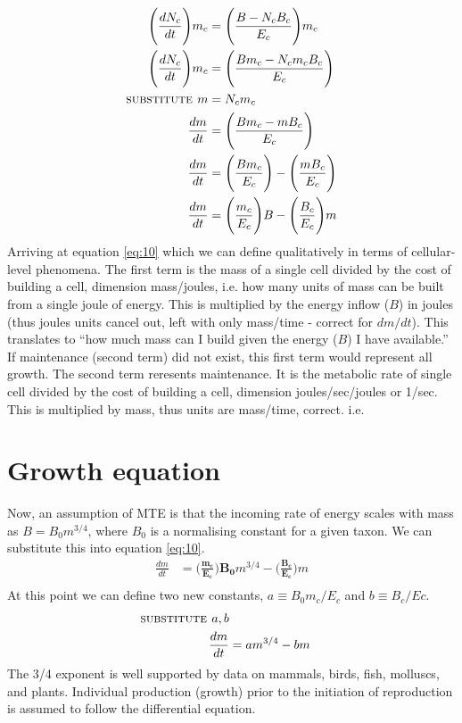 \documentclass[a4paper]{article} %
\begin{document}
\begin{align}
    \Bigg(\frac{dN_{c}}{dt}\Bigg)m_c &= \Bigg(\frac{B - N_{c}B_{c}}{E_{c}}\Bigg)m_c \\
    \Bigg(\frac{dN_{c}}{dt}\Bigg)m_c &= \Bigg(\frac{Bm_c - N_{c}m_{c}B_{c}}{E_c}\Bigg) \\
    \textsc{substitute } m &= N_{c}m_{c} \\
    \frac{dm}{dt} &= \Bigg(\frac{Bm_c - mB_{c}}{E_c}\Bigg) \\
    \frac{dm}{dt} &= \Bigg(\frac{Bm_c}{E_c}\Bigg) - \Bigg(\frac{mB_{c}}{E_c}\Bigg) \\
    \frac{dm}{dt} &= \Bigg(\frac{m_c}{E_c}\Bigg)B - \Bigg(\frac{B_{c}}{E_c}\Bigg)m \label{eq:10}
\end{align}
Arriving at equation \ref{eq:10} which we can define qualitatively in terms of cellular-level phenomena. The first term is the mass of a single cell divided by the cost of building a cell, dimension mass/joules, i.e. how many units of mass can be built from a single joule of energy. This is multiplied by the energy inflow ($B$) in joules (thus joules units cancel out, left with only mass/time - correct for $dm/dt$). This translates to ``how much mass can I build given the energy ($B$) I have available.'' If maintenance (second term) did not exist, this first term would represent all growth. The second term reresents maintenance. It is the metabolic rate of single cell divided by the cost of building a cell, dimension joules/sec/joules or 1/sec. This is multiplied by mass, thus units are mass/time, correct. i.e. 
\section{Growth equation}
Now, an assumption of MTE is that the incoming rate of energy scales with mass as $B = B_{0}m^{3/4}$, where $B_0$ is a normalising constant for a given taxon. We can substitute this into equation \ref{eq:10}.
\begin{align}
    \frac{dm}{dt} &= \bm{\Bigg(\frac{m_c}{E_c}\Bigg)B_{0}}m^{3/4} - \bm{\Bigg(\frac{B_{c}}{E_c}\Bigg)}m \\
\end{align}
At this point we can define two new constants, $a \equiv B_{0}m_{c}/E_{c}$ and $b \equiv B_{c}/E{c}$.
\begin{align}
    \textsc{substitute }a, b \\
    \frac{dm}{dt} &= am^{3/4} - bm
\end{align}
The 3/4 exponent is well supported by data on mammals, birds, fish, molluscs, and plants. Individual production (growth) prior to the initiation of reproduction is assumed to follow the differential equation.
\end{document}
